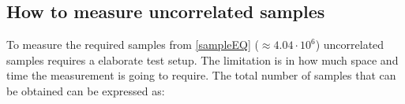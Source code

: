 

\subsection{How to measure uncorrelated samples}
\label{howtomeasureUS}
To measure the required samples from \autoref{sampleEQ} ($\approx 4.04\cdot10^6$) uncorrelated samples requires a elaborate test setup. The limitation is in how much space and time the measurement is going to require. The total number of samples that can be obtained can be expressed as: 

